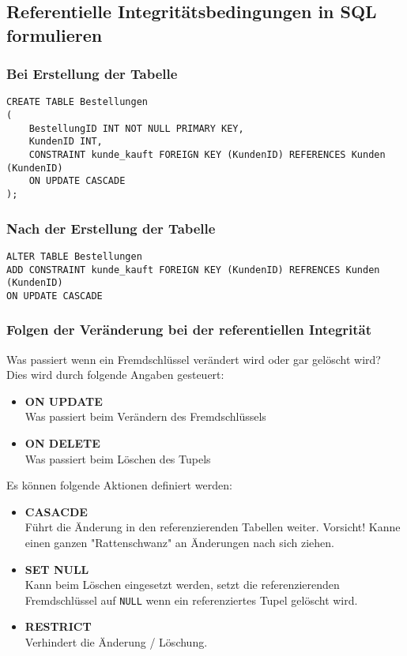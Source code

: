 \subsection{Referentielle Integritätsbedingungen in SQL formulieren}

\subsubsection{Bei Erstellung der Tabelle}
\begin{lstlisting}[caption={Referentielle Integrität bei Erstellung}]
CREATE TABLE Bestellungen
(
    BestellungID INT NOT NULL PRIMARY KEY,
    KundenID INT,
    CONSTRAINT kunde_kauft FOREIGN KEY (KundenID) REFERENCES Kunden (KundenID)
    ON UPDATE CASCADE
);
\end{lstlisting}

\subsubsection{Nach der Erstellung der Tabelle}
\begin{lstlisting}[caption={Referentielle Integrität Update}]
ALTER TABLE Bestellungen
ADD CONSTRAINT kunde_kauft FOREIGN KEY (KundenID) REFRENCES Kunden (KundenID)
ON UPDATE CASCADE
\end{lstlisting}

\subsubsection{Folgen der Veränderung bei der referentiellen Integrität}
Was passiert wenn ein Fremdschlüssel verändert wird oder gar gelöscht wird? Dies wird durch folgende Angaben gesteuert:

\begin{itemize}
  \item \textbf{ON UPDATE} \\
  Was passiert beim Verändern des Fremdschlüssels
  \item \textbf{ON DELETE} \\
  Was passiert beim Löschen des Tupels
\end{itemize}

\noindent
Es können folgende Aktionen definiert werden:

\begin{itemize}
  \item \textbf{CASACDE} \\
  Führt die Änderung in den referenzierenden Tabellen weiter. Vorsicht! Kanne einen ganzen "Rattenschwanz" an Änderungen nach sich ziehen.
  \item \textbf{SET NULL} \\
  Kann beim Löschen eingesetzt werden, setzt die referenzierenden Fremdschlüssel auf \texttt{NULL} wenn ein referenziertes Tupel gelöscht wird.
  \item \textbf{RESTRICT} \\
  Verhindert die Änderung / Löschung.
\end{itemize}

